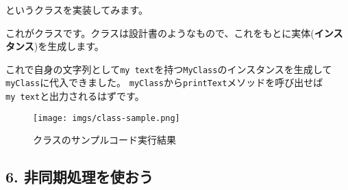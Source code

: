 というクラスを実装してみます。

\begin{Shaded}
\begin{Highlighting}[]
\OperatorTok{=} \OperatorTok{;}
  
     \OperatorTok{=}\OperatorTok{;}
\NormalTok{  \}}

  \NormalTok{ () \{}
    \NormalTok{(}\NormalTok{)}\OperatorTok{;}
\NormalTok{  \}}
\NormalTok{\}}
\end{Highlighting}
\end{Shaded}

これがクラスです。クラスは設計書のようなもので、これをもとに実体(\textbf{インスタンス})を生成します。

\begin{Shaded}
\begin{Highlighting}[]
\OperatorTok{=}  \NormalTok{(}\NormalTok{)}\OperatorTok{;}
\end{Highlighting}
\end{Shaded}

これで自身の文字列として\texttt{\textquotesingle{}my\ text\textquotesingle{}}を持つ\texttt{MyClass}のインスタンスを生成して\texttt{myClass}に代入できました。
\texttt{myClass}から\texttt{printText}メソッドを呼び出せば\texttt{\textquotesingle{}my\ text\textquotesingle{}}と出力されるはずです。

\begin{Shaded}
\begin{Highlighting}[]
\NormalTok{()}\OperatorTok{;}
\end{Highlighting}
\end{Shaded}

\begin{figure}
\centering
\texttt{[image: imgs/class-sample.png]}
\caption{クラスのサンプルコード実行結果}
\end{figure}

\subsection{6.
非同期処理を使おう}\label{ux975eux540cux671fux51e6ux7406ux3092ux4f7fux304aux3046}

